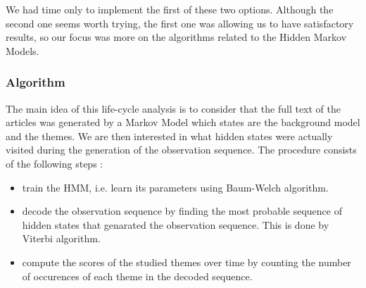 We had time only to implement the first of these two options. Although the second one seems worth trying, the first one was allowing us to have satisfactory results, so our focus was more on the algorithms related to the Hidden Markov Models.


\subsubsection*{Algorithm}
The main idea of this life-cycle analysis is to consider that the full text of the articles was generated by a Markov Model which states are the background model and the themes. We are then interested in what hidden states were actually visited during the generation of the observation sequence. The procedure consists of the following steps :

\begin{itemize}
\item train the HMM, i.e. learn its parameters using Baum-Welch algorithm.
\item decode the observation sequence by finding the most probable sequence of hidden states that genarated the observation sequence. This is done by Viterbi algorithm.
\item compute the scores of the studied themes over time by counting the number of occurences of each theme in the decoded sequence.
\end{itemize}


